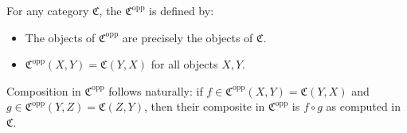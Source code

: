 For any category $\mathfrak{C}$, the  $\mathfrak{C}^{\text{opp}}$ is defined by:
\begin{itemize}
\item The objects of $\mathfrak{C}^{\text{opp}}$ are precisely the objects of $\mathfrak{C}$.
\item $\mathfrak{C}^{\text{opp}}(X, Y) = \mathfrak{C}(Y, X)$ for all objects $X, Y$.
\end{itemize}
Composition in $\mathfrak{C}^{\text{opp}}$ follows naturally: if $f \in \mathfrak{C}^{\text{opp}}(X, Y) = \mathfrak{C}(Y, X)$ and $g \in \mathfrak{C}^{\text{opp}}(Y, Z) = \mathfrak{C}(Z, Y)$, then their composite in $\mathfrak{C}^{\text{opp}}$ is $f \circ g$ as computed in $\mathfrak{C}$.
